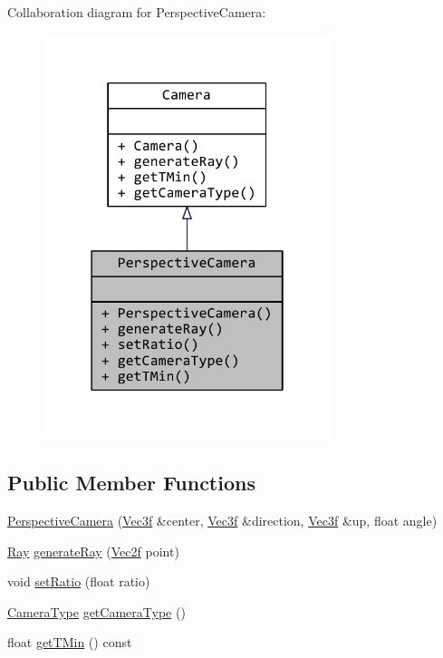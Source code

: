 Collaboration diagram for Perspective\+Camera\+:
\nopagebreak
\begin{figure}[H]
\begin{center}
\leavevmode
\includegraphics[width=238pt]{classPerspectiveCamera__coll__graph}
\end{center}
\end{figure}
\subsection*{Public Member Functions}
\begin{DoxyCompactItemize}
\item 
\hyperlink{classPerspectiveCamera_a79e25c695b09c9500b585880e726a0f8}{Perspective\+Camera} (\hyperlink{classVec3f}{Vec3f} \&center, \hyperlink{classVec3f}{Vec3f} \&direction, \hyperlink{classVec3f}{Vec3f} \&up, float angle)
\item 
\hyperlink{classRay}{Ray} \hyperlink{classPerspectiveCamera_a28eb145d362d3861f8f92cb25a448602}{generate\+Ray} (\hyperlink{classVec2f}{Vec2f} point)
\item 
void \hyperlink{classPerspectiveCamera_a87c53b9f1c47e4d0c3cf4496fb780f7c}{set\+Ratio} (float ratio)
\item 
\hyperlink{Camera_8h_af7eb92b45c5f7f64f02821f87c385ebb}{Camera\+Type} \hyperlink{classPerspectiveCamera_adc1355f80042153eabbf25f618655655}{get\+Camera\+Type} ()
\item 
float \hyperlink{classPerspectiveCamera_a3a82bc5e9f2fd72faaaf42b3919ecf8a}{get\+T\+Min} () const 
\end{DoxyCompactItemize}


